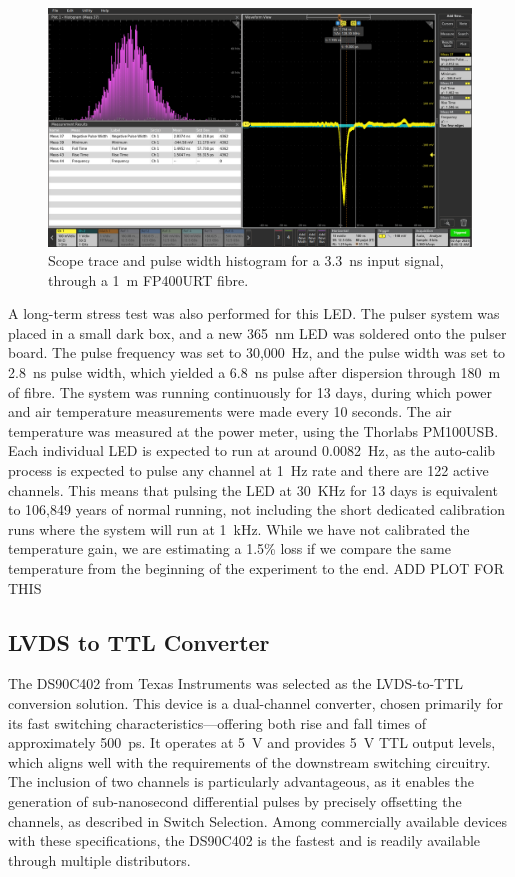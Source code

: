 \documentclass[a4paper,11pt]{article}
\begin{document}
\begin{figure}[h]
\centering
\includegraphics[width=\textwidth]{1LargePulse}
\caption{Scope trace and pulse width histogram for a 3.3~ns input signal, through a 1~m FP400URT fibre.}\label{fig:1LargePulse}
\end{figure}

A long-term stress test was also performed for this LED. The pulser system was placed in a small dark box, and a new 365~nm LED was soldered onto the pulser board. The pulse frequency was set to 30,000~Hz, and the pulse width was set to 2.8~ns pulse width, which yielded a 6.8~ns pulse after dispersion through 180~m of fibre. The system was running continuously for 13 days, during which power and air temperature measurements were made every 10 seconds. The air temperature was measured at the power meter, using the Thorlabs PM100USB. Each individual LED is expected to run at around 0.0082~Hz, as the auto-calib process is expected to pulse any channel at 1~Hz rate and there are 122 active channels. This means that pulsing the LED at 30~KHz for 13 days is equivalent to 106,849 years of normal running, not including the short dedicated calibration runs where the system will run at 1~kHz. While we have not calibrated the temperature gain, we are estimating a 1.5\% loss if we compare the same temperature from the beginning of the experiment to the end. %
{\color{red} ADD PLOT FOR THIS}



\subsection{LVDS to TTL Converter}

The DS90C402 \cite{DS90C402} from Texas Instruments was selected as the LVDS-to-TTL conversion solution. This device is a dual-channel converter, chosen primarily for its fast switching characteristics—offering both rise and fall times of approximately 500~ps. It operates at 5~V and provides 5~V TTL output levels, which aligns well with the requirements of the downstream switching circuitry. The inclusion of two channels is particularly advantageous, as it enables the generation of sub-nanosecond differential pulses by precisely offsetting the channels, as described in Switch Selection. Among commercially available devices with these specifications, the DS90C402 is the fastest and is readily available through multiple distributors.
\end{document}
